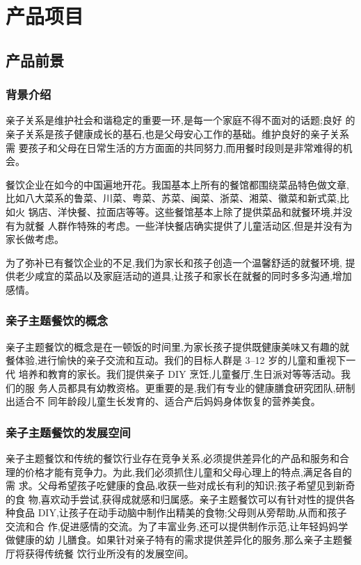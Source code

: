 \chapter{产品项目}

\section{产品前景}

\subsection{背景介绍}
亲子关系是维护社会和谐稳定的重要一环,是每一个家庭不得不面对的话题;良好
的亲子关系是孩子健康成长的基石,也是父母安心工作的基础。维护良好的亲子关系需
要孩子和父母在日常生活的方方面面的共同努力,而用餐时段则是非常难得的机会。

餐饮企业在如今的中国遍地开花。我国基本上所有的餐馆都围绕菜品特色做文章,
比如八大菜系的鲁菜、川菜、粤菜、苏菜、闽菜、浙菜、湘菜、徽菜和新式菜,比如火
锅店、洋快餐、拉面店等等。这些餐馆基本上除了提供菜品和就餐环境,并没有为就餐
人群作特殊的考虑。一些洋快餐店确实提供了儿童活动区,但是并没有为家长做考虑。

为了弥补已有餐饮企业的不足,我们为家长和孩子创造一个温馨舒适的就餐环境,
提供老少咸宜的菜品以及家庭活动的道具,让孩子和家长在就餐的同时多多沟通,增加
感情。

\subsection{亲子主题餐饮的概念}
亲子主题餐饮的概念是在一顿饭的时间里,为家长孩子提供既健康美味又有趣的就
餐体验,进行愉快的亲子交流和互动。我们的目标人群是 3--12 岁的儿童和重视下一代
培养和教育的家长。我们提供亲子 DIY 烹饪,儿童餐厅,生日派对等等活动。我们的服
务人员都具有幼教资格。更重要的是,我们有专业的健康膳食研究团队,研制出适合不
同年龄段儿童生长发育的、适合产后妈妈身体恢复的营养美食。

\subsection{亲子主题餐饮的发展空间}
亲子主题餐饮和传统的餐饮行业存在竞争关系,必须提供差异化的产品和服务和合
理的价格才能有竞争力。为此,我们必须抓住儿童和父母心理上的特点,满足各自的需
求。父母希望孩子吃健康的食品,收获一些对成长有利的知识;孩子希望见到新奇的食
物,喜欢动手尝试,获得成就感和归属感。亲子主题餐饮可以有针对性的提供各种食品
DIY,让孩子在动手动脑中制作出精美的食物;父母则从旁帮助,从而和孩子交流和合
作,促进感情的交流。为了丰富业务,还可以提供制作示范,让年轻妈妈学做健康的幼
儿膳食。如果针对亲子特有的需求提供差异化的服务,那么亲子主题餐厅将获得传统餐
饮行业所没有的发展空间。

